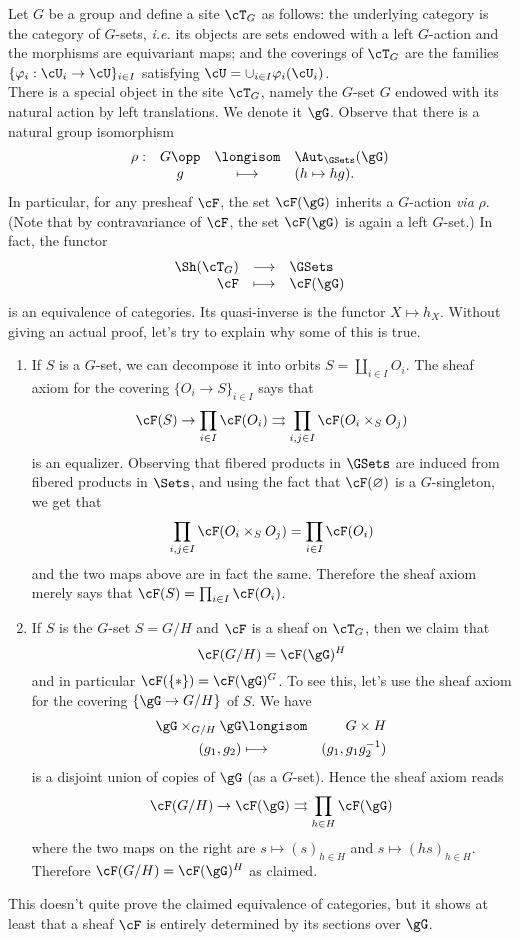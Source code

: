 Let $G$ be a group and define a site $\cT_G$ as follows: the underlying category is the category of $G$-sets, {\it i.e.} its objects are sets endowed with a left $G$-action and the morphisms are equivariant maps; and the coverings of $\cT_G$ are the families $\{\varphi_i : \cU_i \to \cU \}_{i\in I}$ satisfying $\cU = \cup_{i\in I} \varphi_i (\cU_i)$. 
\\
There is a special object in the site $\cT_G$, namely the $G$-set $G$ endowed with its natural action by left translations. We denote it $\gG$. Observe that there is a natural group isomorphism
$$
\begin{array}{rccl}
\rho: & G\opp & \longisom & \Aut_{\GSets}(\gG) \\
& g & \longmapsto & (h \mapsto hg).
\end{array}
$$
In particular, for any presheaf $\cF$, the set $\cF(\gG)$  inherits a $G$-action \emph{via} $\rho$. (Note that by contravariance of $\cF$, the set $\cF(\gG)$ is again a left $G$-set.) In fact, the functor 
$$
\begin{array}{rcl}
\Sh(\cT_G) & \longrightarrow & \GSets \\
\cF & \longmapsto & \cF(\gG)
\end{array}
$$
is an equivalence of categories. Its quasi-inverse is the functor $X \mapsto h_X$. Without giving an actual proof, let's try to explain why some of this is true.
\begin{enumerate}[\it Step 1.]
\item 
If $S$ is a $G$-set, we can decompose it into orbits $S = \coprod_{i\in I} O_i$. The sheaf axiom for the covering $\{O_i \to S\}_{i\in I}$ says that 
$$
\cF(S) \to \prod_{i\in I} \cF(O_i) \rightrightarrows \prod_{i,j \in I} \cF(O_i \times_S O_j)
$$
is an equalizer. Observing that fibered products in $\GSets$ are induced from fibered products in $\Sets$, and using the fact that $\cF(\varnothing)$ is a $G$-singleton, we get that 
$$
\prod_{i,j \in I} \cF(O_i \times_S O_j) = \prod_{i \in I} \cF(O_i)
$$
and the two maps above are in fact the same. Therefore the sheaf axiom merely says that $\cF(S) = \prod_{i\in I} \cF(O_i)$.
\item
If $S$ is the $G$-set $S= G/H$ and $\cF$ is a sheaf on $\cT_G$, then we claim that
$$
\cF(G/H) = \cF(\gG)^H
$$
and in particular $\cF(\{*\}) = \cF(\gG)^G$. To see this, let's use the sheaf axiom for the covering $\{ \gG \to G/H \}$ of $S$. We have 
\begin{eqnarray*}
\gG  \times_{G/H} \gG & \longisom & G \times H \\
(g_1, g_2) & \longmapsto & (g_1, g_1 g_2^{-1})
\end{eqnarray*}
is a disjoint union of copies of $\gG$ (as a $G$-set). Hence the sheaf axiom reads
$$
\cF (G/H) \to \cF(\gG) \rightrightarrows \prod_{h\in H} \cF(\gG)
$$
where the two maps on the right are $s \mapsto  (s)_{h \in H}$ and $s \mapsto  (hs)_{h \in H}$. Therefore $\cF(G/H) = \cF(\gG)^H$ as claimed.
\end{enumerate}
This doesn't quite prove the claimed equivalence of categories, but it shows at least that a sheaf $\cF$ is entirely determined by its sections over $\gG$.

